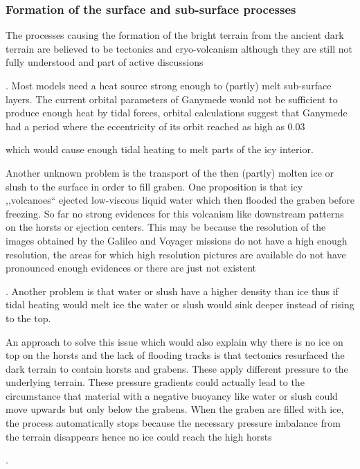 \subsubsection{Formation of the surface and sub-surface processes\label{sub:volcanism}}

The processes causing the formation of the bright terrain from the
ancient dark terrain are believed to be tectonics and cryo-volcanism
although they are still not fully understood and part of active discussions%

. Most models need a heat source strong enough to (partly) melt sub-surface
layers. The current orbital parameters of Ganymede would not be sufficient
to produce enough heat by tidal forces, orbital calculations suggest
that Ganymede had a period where the eccentricity of its orbit reached
as high as 0.03 %

{} which would cause enough tidal heating to melt parts of the icy interior. 

Another unknown problem is the transport of the then (partly) molten
ice or slush to the surface in order to fill graben. One proposition
is that icy ,,volcanoes`` ejected low-viscous liquid water which
then flooded the graben before freezing. So far no strong evidences
for this volcanism like downstream patterns on the horsts or ejection
centers. This may be because the resolution of the images obtained
by the Galileo and Voyager missions do not have a high enough resolution,
the areas for which high resolution pictures are available do not
have pronounced enough evidences or there are just not existent%

. Another problem is that water or slush have a higher density than
ice thus if tidal heating would melt ice the water or slush would
sink deeper instead of rising to the top.

An approach to solve this issue which would also explain why there
is no ice on top on the horsts and the lack of flooding tracks is
that tectonics resurfaced the dark terrain to contain horsts and grabens.
These apply different pressure to the underlying terrain. These pressure
gradients could actually lead to the circumstance that material with
a negative buoyancy like water or slush could move upwards but only
below the grabens. When the graben are filled with ice, the process
automatically stops because the necessary pressure imbalance from
the terrain disappears hence no ice could reach the high horsts%

. 

